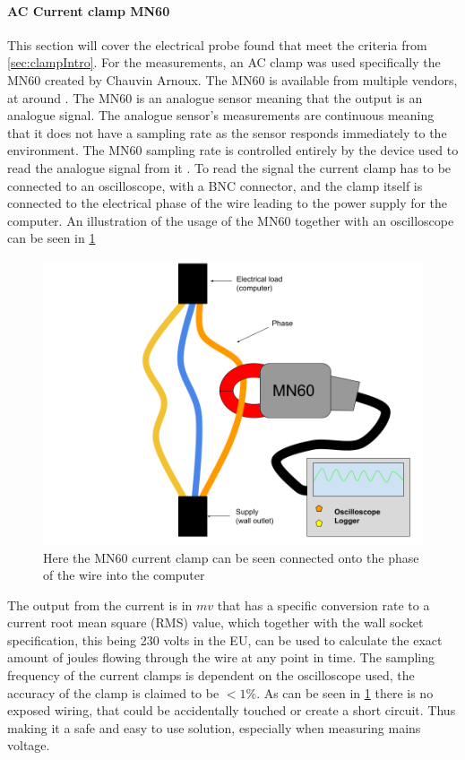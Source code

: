 \paragraph*{AC Current clamp MN60}

This section will cover the electrical probe found that meet the criteria from \ref{sec:clampIntro}. For the measurements, an AC clamp was used specifically the MN60 created by Chauvin Arnoux\cite*{ChauvinArnoux}. The MN60 is available from multiple vendors, at around . The MN60 is an analogue sensor meaning that the output is an analogue signal. The analogue sensor's measurements are continuous meaning that it does not have a sampling rate as the sensor responds immediately to the environment\cite{agarwal2005foundations}. The MN60 sampling rate is controlled entirely by the device used to read the analogue signal from it \cite{agarwal2005foundations}. To read the signal the current clamp has to be connected to an oscilloscope, with a BNC connector\cite{ClampDoc}, and the clamp itself is connected to the electrical phase of the wire leading to the power supply for the computer. An illustration of the usage of the MN60 together with an oscilloscope can be seen in \cref{fig:clampSetup}
\begin{figure}[h!]
    \centering
    \includegraphics*[scale=0.25]{figures/CLAMP.png}
    \caption{Here the MN60 current clamp can be seen connected onto the phase of the wire into the computer}
    \label{fig:clampSetup}
\end{figure}
The output from the current is in $mv$ that has a specific conversion rate to a current root mean square (RMS) value, which together with the wall socket specification, this being 230 volts in the EU\cite{sik}, can be used to calculate the exact amount of joules flowing through the wire at any point in time. The sampling frequency of the current clamps is dependent on the oscilloscope used, the accuracy of the clamp is claimed to be $<1\%$\cite{ClampDoc}. As can be seen in \ref{fig:clampSetup} there is no exposed wiring, that could be accidentally touched or create a short circuit. Thus making it a safe and easy to use solution, especially when measuring mains voltage.


